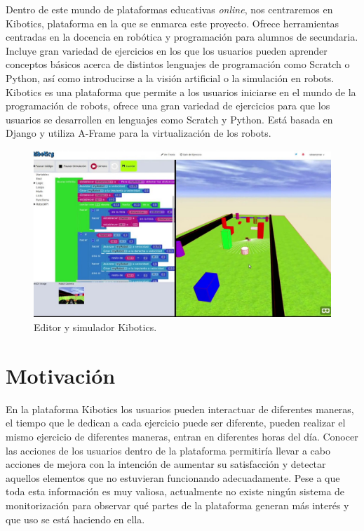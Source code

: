 \documentclass[a4paper, 12pt]{book}
\begin{document}
		Dentro de este mundo de plataformas educativas \textit{online}, nos centraremos en Kibotics, plataforma en la que se enmarca este proyecto. Ofrece herramientas centradas en la docencia en robótica y programación para alumnos de secundaria. Incluye gran variedad de ejercicios en los que los usuarios pueden aprender conceptos básicos acerca de distintos lenguajes de programación como Scratch o Python, así como introducirse a la visión artificial o la simulación en robots. Kibotics es una plataforma que permite a los usuarios iniciarse en el mundo de la programación de robots, ofrece una gran variedad de ejercicios para que los usuarios se desarrollen en lenguajes como Scratch y Python. Está basada en Django y utiliza A-Frame para la virtualización de los robots.\\
		
		\begin{figure}[H]
			\centering
			\includegraphics[width=13cm, keepaspectratio]{img/editor_simulador_kibotics.jpg}
			\caption{Editor y simulador Kibotics.}
			\label{fig:editor_simulador_kibotics}
		\end{figure}


	\section{Motivación}
	\label{sec:motivación}
		
		En la plataforma Kibotics los usuarios pueden interactuar de diferentes maneras, el tiempo que le dedican a cada ejercicio puede ser diferente, pueden realizar el mismo ejercicio de diferentes maneras, entran en diferentes horas del día. Conocer las acciones de los usuarios dentro de la plataforma permitiría llevar a cabo acciones de mejora con la intención de aumentar su satisfacción y detectar aquellos elementos que no estuvieran funcionando adecuadamente. Pese a que toda esta información es muy valiosa, actualmente no existe ningún sistema de monitorización para observar qué partes de la plataforma generan más interés y que uso se está haciendo en ella.  \\
\end{document}
